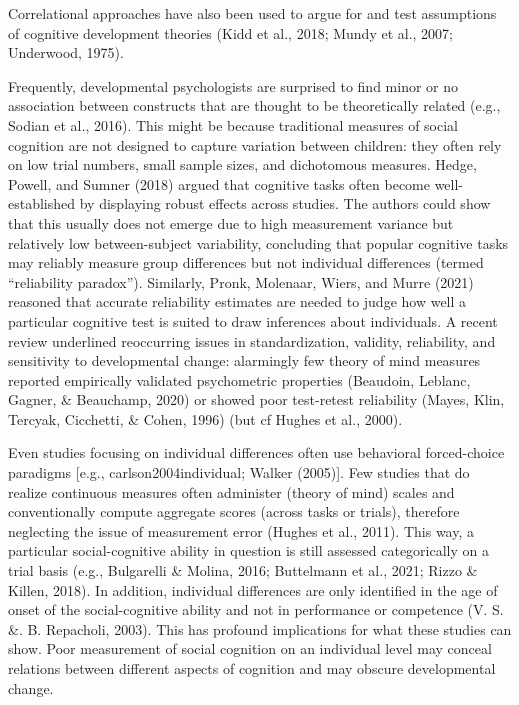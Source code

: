 \documentclass[
  man,floatsintext]{apa6}
\begin{document}
Correlational approaches have also been used to argue for and test assumptions of cognitive development theories (Kidd et al., 2018; Mundy et al., 2007; Underwood, 1975).

Frequently, developmental psychologists are surprised to find minor or no association between constructs that are thought to be theoretically related (e.g., Sodian et al., 2016).
This might be because traditional measures of social cognition are not designed to capture variation between children:
they often rely on low trial numbers, small sample sizes, and dichotomous measures.
Hedge, Powell, and Sumner (2018) argued that cognitive tasks often become well-established by displaying robust effects across studies.
The authors could show that this usually does not emerge due to high measurement variance but relatively low between-subject variability, concluding that popular cognitive tasks may reliably measure group differences but not individual differences (termed ``reliability paradox'').
Similarly, Pronk, Molenaar, Wiers, and Murre (2021) reasoned that accurate reliability estimates are needed to judge how well a particular cognitive test is suited to draw inferences about individuals.
A recent review underlined reoccurring issues in standardization, validity, reliability, and sensitivity to developmental change: alarmingly few theory of mind measures reported empirically validated psychometric properties (Beaudoin, Leblanc, Gagner, \& Beauchamp, 2020) or showed poor test-retest reliability (Mayes, Klin, Tercyak, Cicchetti, \& Cohen, 1996) (but cf Hughes et al., 2000).

Even studies focusing on individual differences often use behavioral forced-choice paradigms {[}e.g., carlson2004individual; Walker (2005){]}.
Few studies that do realize continuous measures often administer (theory of mind) scales and conventionally compute aggregate scores (across tasks or trials), therefore neglecting the issue of measurement error (Hughes et al., 2011).
This way, a particular social-cognitive ability in question is still assessed categorically on a trial basis (e.g., Bulgarelli \& Molina, 2016; Buttelmann et al., 2021; Rizzo \& Killen, 2018). In addition, individual differences are only identified in the age of onset of the social-cognitive ability and not in performance or competence (V. S. \&. B. Repacholi, 2003).
This has profound implications for what these studies can show.
Poor measurement of social cognition on an individual level may conceal relations between different aspects of cognition and may obscure developmental change.
\end{document}
